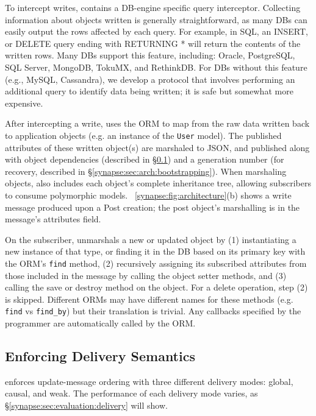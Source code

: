 To intercept writes, \synapse contains a DB-engine specific query interceptor.
Collecting information about objects written is
generally straightforward, as many DBs can easily output the rows affected
by each query. For example, in SQL, an {\code INSERT}, or {\code DELETE}
query ending with {\code RETURNING *} will return the contents of the
written rows. Many DBs support this feature, including: Oracle, PostgreSQL, SQL
Server, MongoDB, TokuMX, and RethinkDB. For DBs without this feature
(e.g., MySQL, Cassandra), we develop a protocol that involves performing an additional
query to identify data being written; it is safe but somewhat more expensive.

After intercepting a write, \synapse uses the ORM to map from the raw data
written back to application objects (e.g. an instance of the {\tt User} model).
The published attributes of these written object(s) are marshaled to JSON, and published
along with object dependencies (described in
\S\ref{synapse:sec:arch:cross-db-causality}) and a generation number (for recovery,
described in \S\ref{synapse:sec:arch:bootstrapping}). When marshaling objects,
\synapse also includes each object's complete inheritance tree, allowing
subscribers to consume polymorphic models.
\F~\ref{synapse:fig:architecture}(b) shows a write message produced
upon a {\code Post} creation; the post object's marshalling is in the message's
{\code attributes} field.

On the subscriber, \synapse unmarshals a new or updated object by (1)
instantiating a new instance of that type, or finding it in the DB based on its primary key with
the ORM's {\tt find} method, (2) recursively assigning its
subscribed attributes from those included in the message by calling the
object setter methods, and (3) calling the {\code save} or {\code
destroy} method on the object. For a delete operation, step (2) is skipped.
Different ORMs may have different names for these methods (e.g. {\tt find} vs
{\tt find\_by}) but their translation is trivial. Any callbacks specified by the
programmer are automatically called by the ORM.

\subsection{Enforcing Delivery Semantics} \label{synapse:sec:arch:cross-db-causality}

\synapse enforces update-message ordering with three different
delivery modes: global, causal, and weak. The performance of each delivery mode
varies, as \S\ref{synapse:sec:evaluation:delivery} will show.

